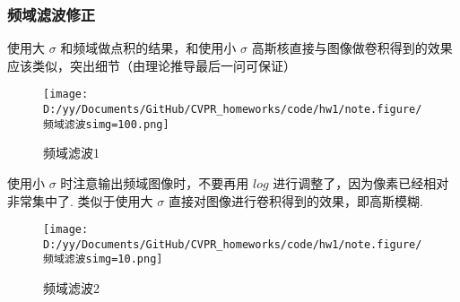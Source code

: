 \documentclass[12pt, a4paper, oneside]{ctexart}
\begin{document}
\subsubsection*{频域滤波修正}

使用大 \(\sigma\) 和频域做点积的结果，和使用小 \(\sigma\)
高斯核直接与图像做卷积得到的效果应该类似，突出细节（由理论推导最后一问可保证）

\begin{figure}[htbp]
    \centering
    \texttt{[image: D:/yy/Documents/GitHub/CVPR\_homeworks/code/hw1/note.figure/频域滤波simg=100.png]}
    \caption{频域滤波1}
\end{figure}

使用小 \(\sigma\) 时注意输出频域图像时，不要再用 \(log\)
进行调整了，因为像素已经相对非常集中了. 类似于使用大 \(\sigma\)
直接对图像进行卷积得到的效果，即高斯模糊.

\begin{figure}[htbp]
    \centering
    \texttt{[image: D:/yy/Documents/GitHub/CVPR\_homeworks/code/hw1/note.figure/频域滤波simg=10.png]}
    \caption{频域滤波2}
\end{figure}
\end{document}

